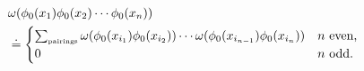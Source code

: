 \begin{equation} \label{wick}
\begin{split}
& {\omega}({\phi_0} (x_{1}){\phi_0}(x_{2}) \cdots {\phi_0}(x_{n}))
\\ 
& \doteq
\begin{cases}
\sum_{\mbox{\tiny pairings}} 
{\omega}({\phi_0}(x_{i_1}) \phi_0(x_{i_2})) \cdots 
{\omega} ({\phi_0}(x_{i_{n-1}}){\phi_0}(x_{i_n})) & 
\text{$n$ even,} \\ 
0 & \text{$n$ odd.}
\end{cases}
\end{split}
\end{equation}

